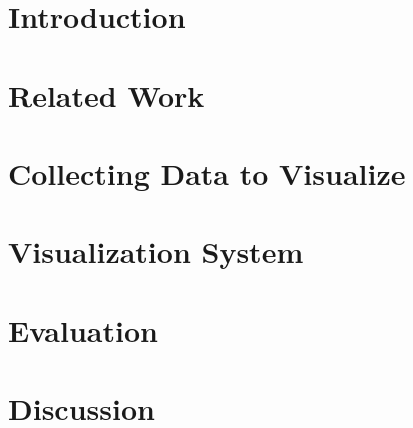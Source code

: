 \documentclass[conference]{IEEEtran}
\begin{document}
\section{Introduction}


\section{Related Work}


\section{Collecting Data to Visualize}


\section{Visualization System}


\section{Evaluation}


\section{Discussion}




\end{document}
